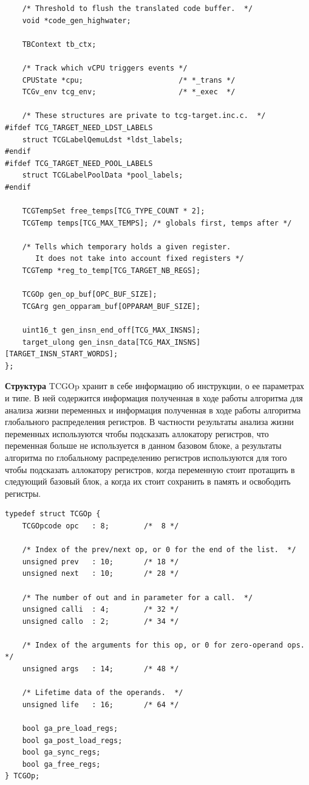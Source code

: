 \begin{small}
\begin{verbatim}
    /* Threshold to flush the translated code buffer.  */
    void *code_gen_highwater;

    TBContext tb_ctx;

    /* Track which vCPU triggers events */
    CPUState *cpu;                      /* *_trans */
    TCGv_env tcg_env;                   /* *_exec  */

    /* These structures are private to tcg-target.inc.c.  */
#ifdef TCG_TARGET_NEED_LDST_LABELS
    struct TCGLabelQemuLdst *ldst_labels;
#endif
#ifdef TCG_TARGET_NEED_POOL_LABELS
    struct TCGLabelPoolData *pool_labels;
#endif

    TCGTempSet free_temps[TCG_TYPE_COUNT * 2];
    TCGTemp temps[TCG_MAX_TEMPS]; /* globals first, temps after */

    /* Tells which temporary holds a given register.
       It does not take into account fixed registers */
    TCGTemp *reg_to_temp[TCG_TARGET_NB_REGS];

    TCGOp gen_op_buf[OPC_BUF_SIZE];
    TCGArg gen_opparam_buf[OPPARAM_BUF_SIZE];

    uint16_t gen_insn_end_off[TCG_MAX_INSNS];
    target_ulong gen_insn_data[TCG_MAX_INSNS][TARGET_INSN_START_WORDS];
};
\end{verbatim}
\end{small}


\textbf{Структура}
TCGOp хранит в себе информацию об инструкции, о ее параметрах и типе. В ней содержится информация полученная в ходе работы алгоритма для анализа жизни переменных и информация полученная в ходе работы
алгоритма глобального распределения регистров. В частности результаты анализа жизни переменных используются чтобы подсказать аллокатору регистров, что переменная больше не используется в данном базовом блоке, а результаты алгоритма по глобальному распределению регистров используются для того чтобы подсказать аллокатору регистров, когда переменную стоит протащить в следующий базовый блок, а когда их стоит сохранить в память и освободить регистры.

\begin{small}
\begin{verbatim}
typedef struct TCGOp {
    TCGOpcode opc   : 8;        /*  8 */

    /* Index of the prev/next op, or 0 for the end of the list.  */
    unsigned prev   : 10;       /* 18 */
    unsigned next   : 10;       /* 28 */

    /* The number of out and in parameter for a call.  */
    unsigned calli  : 4;        /* 32 */
    unsigned callo  : 2;        /* 34 */

    /* Index of the arguments for this op, or 0 for zero-operand ops.  */
    unsigned args   : 14;       /* 48 */

    /* Lifetime data of the operands.  */
    unsigned life   : 16;       /* 64 */

    bool ga_pre_load_regs;
    bool ga_post_load_regs;
    bool ga_sync_regs;
    bool ga_free_regs;
} TCGOp;
\end{verbatim}
\end{small}


